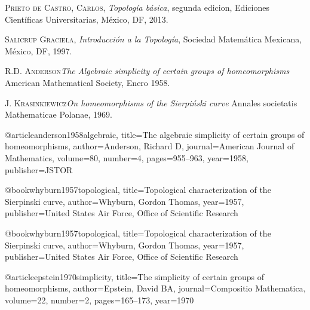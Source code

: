 \begin{thebibliography}{XX}
	 \textsc{Prieto de Castro, Carlos},
\textit{Topología básica}, segunda edicion,
Ediciones Científicas Universitarias, México, DF, 2013.

	 \textsc{Salicrup Graciela},
\textit{Introducción a la Topología}, Sociedad Matemática Mexicana, México, DF, 1997.


	 \textsc{R.D. Anderson}\textit{The Algebraic simplicity of certain groups of homeomorphisms} American Mathematical Society, Enero 1958.
	
	 \textsc{J. Krasinkiewicz}\textit{On  homeomorphisms of the Sierpiński curve} Annales societatis Mathematicae Polanae, 1969.
\end{thebibliography}


@article{anderson1958algebraic,
  title={The algebraic simplicity of certain groups of homeomorphisms},
  author={Anderson, Richard D},
  journal={American Journal of Mathematics},
  volume={80},
  number={4},
  pages={955--963},
  year={1958},
  publisher={JSTOR}
}


@book{whyburn1957topological,
  title={Topological characterization of the Sierpinski curve},
  author={Whyburn, Gordon Thomas},
  year={1957},
  publisher={United States Air Force, Office of Scientific Research}
}

@book{whyburn1957topological,
  title={Topological characterization of the Sierpinski curve},
  author={Whyburn, Gordon Thomas},
  year={1957},
  publisher={United States Air Force, Office of Scientific Research}
}

@article{epstein1970simplicity,
  title={The simplicity of certain groups of homeomorphisms},
  author={Epstein, David BA},
  journal={Compositio Mathematica},
  volume={22},
  number={2},
  pages={165--173},
  year={1970}
}